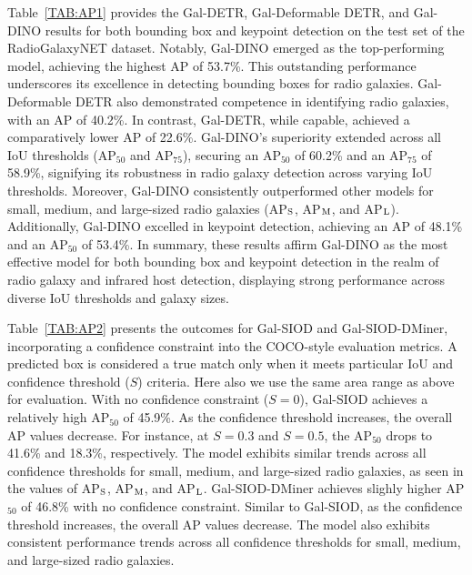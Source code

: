 \documentclass[
  journal=pasa,
  manuscript=research-paper, %
  year=2020,
  volume=37,
]{cup-journal}
\begin{document}
Table~\ref{TAB:AP1} provides the Gal-DETR, Gal-Deformable DETR, and Gal-DINO results for both bounding box and keypoint detection on the test set of the RadioGalaxyNET dataset. 
Notably, Gal-DINO emerged as the top-performing model, achieving the highest AP of 53.7\%. 
This outstanding performance underscores its excellence in detecting bounding boxes for radio galaxies. 
Gal-Deformable DETR also demonstrated competence in identifying radio galaxies, with an AP of 40.2\%. 
In contrast, Gal-DETR, while capable, achieved a comparatively lower AP of 22.6\%. Gal-DINO's superiority extended across all IoU thresholds (AP$_{50}$ and AP$_{75}$), securing an AP$_{50}$ of 60.2\% and an AP$_{75}$ of 58.9\%, signifying its robustness in radio galaxy detection across varying IoU thresholds. 
Moreover, Gal-DINO consistently outperformed other models for small, medium, and large-sized radio galaxies (AP$_{\rm S}$, AP$_{\rm M}$, and AP$_{\rm L}$). Additionally, Gal-DINO excelled in keypoint detection, achieving an AP of 48.1\% and an AP$_{50}$ of 53.4\%. 
In summary, these results affirm Gal-DINO as the most effective model for both bounding box and keypoint detection in the realm of radio galaxy and infrared host detection, displaying strong performance across diverse IoU thresholds and galaxy sizes.


Table~\ref{TAB:AP2} presents the outcomes for Gal-SIOD and Gal-SIOD-DMiner, incorporating a confidence constraint into the COCO-style evaluation metrics. A predicted box is considered a true match only when it meets particular IoU and confidence threshold ($S$) criteria. 
Here also we use the same area range as above for evaluation.
With no confidence constraint ($S=0$), Gal-SIOD achieves a relatively high AP$_{50}$ of 45.9\%. 
As the confidence threshold increases, the overall AP values decrease. For instance, at $S=0.3$ and $S=0.5$, the AP$_{50}$ drops to 41.6\% and 18.3\%, respectively.
The model exhibits similar trends across all confidence thresholds for small, medium, and large-sized radio galaxies, as seen in the values of AP$_{\rm S}$, AP$_{\rm M}$, and AP$_{\rm L}$.
Gal-SIOD-DMiner achieves slighly higher AP$_{50}$ of 46.8\% with no confidence constraint.
Similar to Gal-SIOD, as the confidence threshold increases, the overall AP values decrease. 
The model also exhibits consistent performance trends across all confidence thresholds for small, medium, and large-sized radio galaxies.
\end{document}
